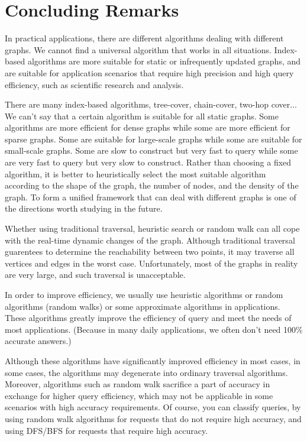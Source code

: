 \documentclass[11pt]{article}
\begin{document}
\section{Concluding Remarks}
In practical applications, there are different algorithms dealing with different graphs. We cannot find a universal algorithm that works in all situations. Index-based algorithms are more suitable for static or infrequently updated graphs, and are suitable for application scenarios that require high precision and high query efficiency, such as scientific research and analysis.

There are many index-based algorithms, tree-cover, chain-cover, two-hop cover... We can’t say that a certain algorithm is suitable for all static graphs. Some algorithms are more efficient for dense graphs while some are more efficient for sparse graphs. Some are suitable for large-scale graphs while some are suitable for small-scale graphs. Some are slow to construct but very fast to query while some are very fast to query but very slow to construct. Rather than choosing a fixed algorithm, it is better to heuristically select the most suitable algorithm according to the shape of the graph, the number of nodes, and the density of the graph. To form a unified framework that can deal with different graphs is one of the directions worth studying in the future.

Whether using traditional traversal, heuristic search or random walk can all cope with the real-time dynamic changes of the graph. Although traditional traversal guarentees to determine the reachability between two points, it may traverse all vertices and edges in the worst case. Unfortunately, most of the graphs in reality are very large, and such traversal is unacceptable.

In order to improve efficiency, we usually use heuristic algorithms or random algorithms (random walks) or some approximate algorithms in applications. These algorithms greatly improve the efficiency of query and meet the needs of most applications. (Because in many daily applications, we often don't need 100\% accurate answers.)

Although these algorithms have significantly improved efficiency in most cases, in some cases, the algorithms may degenerate into ordinary traversal algorithms. Moreover, algorithms such as random walk sacrifice a part of accuracy in exchange for higher query efficiency, which may not be applicable in some scenarios with high accuracy requirements. Of course, you can classify queries, by using random walk algorithms for requests that do not require high accuracy, and using DFS/BFS for requests that require high accuracy. 
\end{document}
